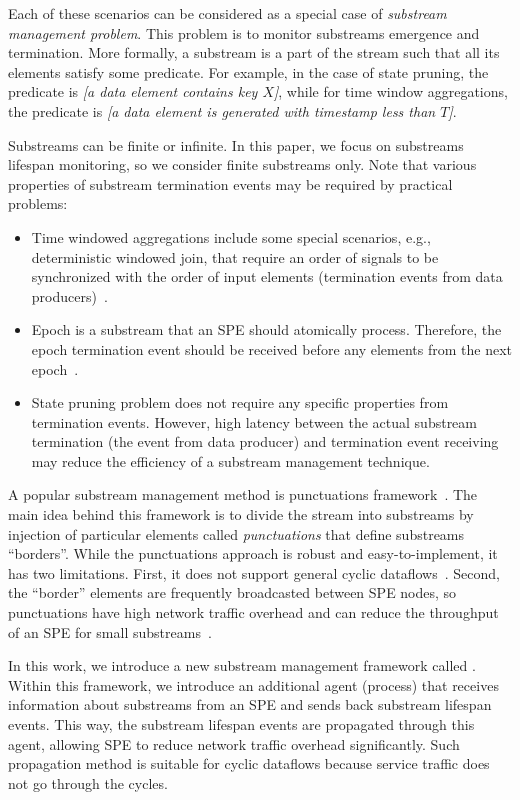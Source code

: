 Each of these scenarios can be considered as a special case of {\em substream management problem}. This problem is to monitor substreams emergence and termination. More formally, a substream is a part of the stream such that all its elements satisfy some predicate. For example, in the case of state pruning, the predicate is {\em [a data element contains key $X$]}, while for time window aggregations, the predicate is {\em [a data element is generated with timestamp less than $T$]}. 

Substreams can be finite or infinite. In this paper, we focus on substreams lifespan monitoring, so we consider finite substreams only. Note that various properties of substream termination events may be required by practical problems:
\begin{itemize}
    \item Time windowed aggregations include some special scenarios, e.g., deterministic windowed join, that require an order of signals to be synchronized with the order of input elements (termination events from data producers)~\cite{najdataei2019stretch, gulisano2016scalejoin}.
    \item Epoch is a substream that an SPE should atomically process. Therefore, the epoch termination event should be received before any elements from the next epoch~\cite{2015arXiv150608603C}. 
    \item State pruning problem does not require any specific properties from termination events. However, high latency between the actual substream termination (the event from data producer) and termination event receiving may reduce the efficiency of a substream management technique.
\end{itemize}

A popular substream management method is punctuations framework~\cite{tucker2003exploiting}. The main idea behind this framework is to divide the stream into substreams by injection of particular elements called {\em punctuations} that define substreams ``borders''. While the punctuations approach is robust and easy-to-implement, it has two limitations. First, it does not support general cyclic dataflows~\cite{carbone2018scalable}. Second, the ``border'' elements are frequently broadcasted between SPE nodes, so punctuations have high network traffic overhead and can reduce the throughput of an SPE for small substreams~\cite{Li:2008:OPN:1453856.1453890}. 

In this work, we introduce a new substream management framework called \tracker. Within this framework, we introduce an additional agent (process) that receives information about substreams from an SPE and sends back substream lifespan events. This way, the substream lifespan events are propagated through this agent, allowing SPE to reduce network traffic overhead significantly. Such propagation method is suitable for cyclic dataflows because service traffic does not go through the cycles.

